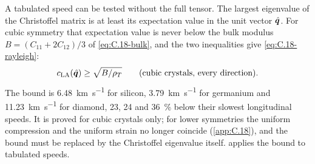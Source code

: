 A tabulated speed can be tested without the full tensor. The largest eigenvalue of the Christoffel matrix is at least its expectation value in the unit vector $\hat{\bm{q}}$. For cubic symmetry that expectation value is never below the bulk modulus $B = (C_{11} + 2C_{12})/3$ of \cref{eq:C.18-bulk}, and the two inequalities give \cref{eq:C.18-rayleigh}:
\begin{equation}
  c_{\mathrm{LA}}(\hat{\bm{q}}) \ge \sqrt{B/\rho_T} \qquad\text{(cubic crystals, every direction)} .
  \label{eq:11.1-rayleigh}
\end{equation}
The bound is \SI{6.48}{km.s^{-1}} for silicon, \SI{3.79}{km.s^{-1}} for germanium and \SI{11.23}{km.s^{-1}} for diamond, 23, 24 and \SI{36}{\percent} below their slowest longitudinal speeds. It is proved for cubic crystals only; for lower symmetries the uniform compression and the uniform strain no longer coincide (\cref{app:C.18}), and the bound must be replaced by the Christoffel eigenvalue itself.  applies the bound to tabulated speeds.

